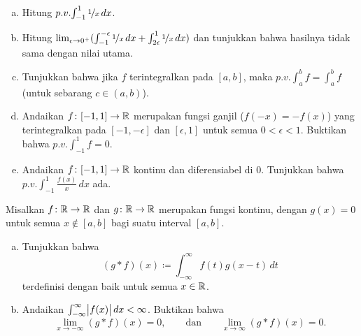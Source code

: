 \begin{exercise}
\leavevmode
\begin{enumerate}[a)]
\item
Hitung $p.v.\!\int_{-1}^1 \nicefrac{1}{x}\,dx$.
\item
Hitung
$\lim_{\epsilon\to 0^+}
( \int_{-1}^{-\epsilon} \nicefrac{1}{x}\,dx +
\int_{2\epsilon}^1 \nicefrac{1}{x}\,dx )$ dan tunjukkan bahwa hasilnya tidak sama
dengan nilai utama.
\item
Tunjukkan bahwa jika $f$ terintegralkan pada $[a,b]$, maka
$p.v.\!\int_a^b f = \int_a^b f$ (untuk sebarang $c \in (a,b)$).
\item
Andaikan $f \colon [-1,1] \to {\mathbb{R}}$
merupakan fungsi ganjil ($f(-x)=-f(x)$) yang terintegralkan pada
$[-1,-\epsilon]$ dan $[\epsilon,1]$ untuk semua $0 < \epsilon < 1$.
Buktikan bahwa
$p.v.\!\int_{-1}^1 f = 0$.
\item
Andaikan
$f \colon [-1,1] \to {\mathbb{R}}$ kontinu dan diferensiabel di 0.  Tunjukkan bahwa
$p.v.\!\int_{-1}^1 \frac{f(x)}{x}\,dx$ ada.
\end{enumerate}
\end{exercise}

\begin{samepage}
\begin{exercise}
Misalkan $f \colon {\mathbb{R}} \to {\mathbb{R}}$ dan
$g \colon {\mathbb{R}} \to {\mathbb{R}}$ merupakan fungsi kontinu, dengan
$g(x) = 0$ untuk semua $x \notin [a,b]$ bagi suatu interval $[a,b]$.
\begin{enumerate}[a)]
\item
Tunjukkan bahwa
\emph{}
\begin{equation*}
(g * f)(x) \coloneqq \int_{-\infty}^\infty f(t)g(x-t)\,dt 
\end{equation*}
terdefinisi dengan baik untuk semua $x \in {\mathbb{R}}$.
\item
Andaikan $\int_{-\infty}^\infty \bigl\lvert {f(x)} \bigr\rvert\,dx < \infty$.  Buktikan bahwa
\begin{equation*}
\lim_{x \to -\infty} (g * f)(x) = 0, \qquad \text{dan} \qquad
\lim_{x \to \infty} (g * f)(x) = 0 .
\end{equation*}
\end{enumerate}
\end{exercise}
\end{samepage}
